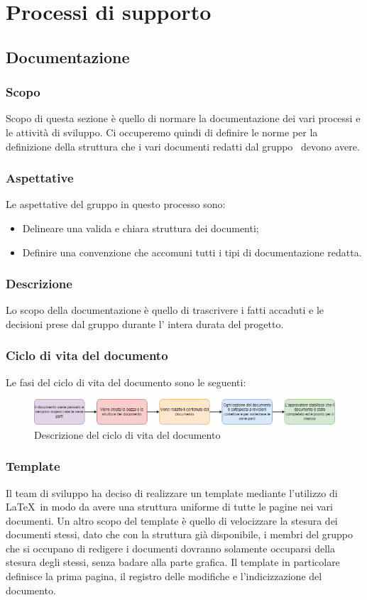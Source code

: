 \section{Processi di supporto}\label{section:processi_supporto}
\subsection{Documentazione}\label{subsection: documentazione}
\subsubsection{Scopo}\label{subsubsection: scopo}
Scopo di questa sezione è quello di normare la documentazione dei vari processi e le attività di sviluppo.
Ci occuperemo quindi di definire le norme per la definizione della struttura che i vari documenti redatti dal gruppo \groupName\ devono avere.
\subsubsection{Aspettative}
Le aspettative del gruppo \groupName in questo processo sono:
\begin{itemize}
    \item Delineare una valida e chiara struttura dei documenti;
    \item Definire una convenzione che accomuni tutti i tipi di documentazione redatta.
 \end {itemize}
\subsubsection{Descrizione}
Lo scopo della documentazione è quello di trascrivere i fatti accaduti e le decisioni prese dal gruppo durante l' intera durata del progetto.
\subsubsection{Ciclo di vita del documento}
Le fasi del ciclo di vita del documento sono le seguenti:
      \begin{figure}[htbp]
         \centering 
         \includegraphics[scale = 0.55]{../template/images/NdP/CicloDiVitaDocumento.png}
         \caption{Descrizione del ciclo di vita del documento}
      \end {figure}
\subsubsection{Template}
Il team di sviluppo ha deciso di realizzare un template mediante l'utilizzo di \LaTeX\ in modo da avere una struttura uniforme di tutte le pagine nei vari documenti.
Un altro scopo del template è quello di velocizzare la stesura dei documenti stessi, dato che con la struttura già disponibile, i membri del gruppo che si occupano di redigere i documenti dovranno solamente occuparsi della stesura degli stessi, senza badare alla parte grafica.
Il template in particolare definisce la prima pagina, il registro delle modifiche e l'indicizzazione del documento.
